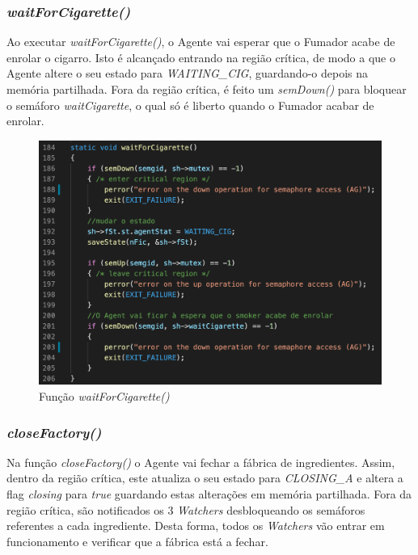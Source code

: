 \documentclass[10pt,portuguese]{article}
\begin{document}
\subsubsection{\textit{waitForCigarette()}}

\par Ao executar \textit{waitForCigarette()}, o Agente vai esperar que o Fumador acabe de enrolar o cigarro. Isto é alcançado entrando na região crítica, de modo a que o Agente altere o seu estado para \textit{WAITING\_CIG}, guardando-o depois na memória partilhada. Fora da região crítica, é feito um \textit{semDown()} para bloquear o semáforo \textit{waitCigarette}, o qual só é liberto quando o Fumador acabar de enrolar.

\begin{figure}[!h]
    \centering
    \includegraphics[width=\textwidth]{images/implementation/waitcig.png}
    \caption{Função \textit{waitForCigarette()}}
\end{figure}

\clearpage

\subsubsection{\textit{closeFactory()}}

\par Na função \textit{closeFactory()} o Agente vai fechar a fábrica de ingredientes. Assim, dentro da região crítica, este atualiza o seu estado para \textit{CLOSING\_A} e altera a flag \textit{closing} para \textit{true} guardando estas alterações em memória partilhada. Fora da região crítica, são notificados os 3 \textit{Watchers} desbloqueando os semáforos referentes a cada ingrediente. Desta forma, todos os \textit{Watchers} vão entrar em funcionamento e verificar que a fábrica está a fechar.
\end{document}
